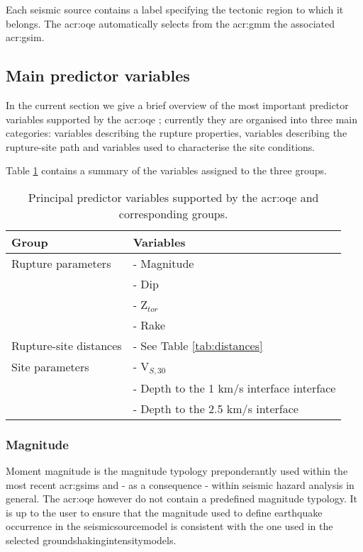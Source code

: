 Each seismic source contains a label specifying 
the tectonic region to which it belongs. The \gls{acr:oqe} automatically 
selects from the \gls{acr:gmm} the associated \gls{acr:gsim}.

%
\subsection{Main predictor variables}
In the current section we give a brief overview of the most 
important predictor variables supported by the \gls{acr:oqe}
\parencite[for general a summary, see][]{akkar2013r}; 
currently they are organised into three main categories: variables 
describing the rupture properties, variables describing the rupture\--site 
path and variables used to characterise the site conditions. 

Table \ref{tab:parameters} contains a summary of the variables
assigned to the three groups.
\begin{table}[!h]
\centering
\begin{tabular}{|p{5cm}p{8cm}|}
\hline
\rowcolor{anti-flashwhite}
\bf{Group} & \bf{Variables} \\
\hline 
Rupture parameters & - Magnitude\\
                   & - Dip \\ 
                   & - Z$_{tor}$ \\ 
                   & - Rake \\ \hline
Rupture-site distances & - See Table \ref{tab:distances} \\ \hline
Site parameters & - V$_{S,30}$ \\
                & - Depth to the 1 km/s interface interface \\
                & - Depth to the 2.5 km/s interface \\ 
\hline
\end{tabular}
\caption{Principal predictor variables supported by the \gls{acr:oqe} and 
    corresponding groups.}
\label{tab:parameters}
\end{table}
%
\subsubsection{Magnitude}
Moment magnitude \parencite{hanks1979} is the magnitude typology 
preponderantly used within the most recent \glspl{acr:gsim} and - as a 
consequence - within seismic hazard analysis in general. 
%
The \gls{acr:oqe} however do not contain a predefined magnitude typology.
It is up to the user to ensure that the magnitude used to define earthquake 
occurrence in the \gls{seismicsourcemodel} is consistent with the one used 
in the selected \glspl{groundshakingintensitymodel}.

